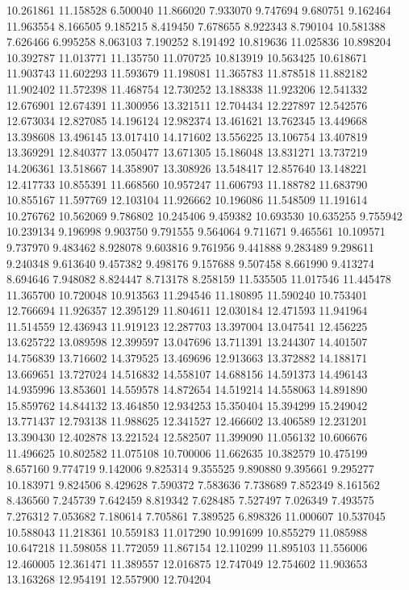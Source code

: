 10.261861
11.158528
6.500040
11.866020
7.933070
9.747694
9.680751
9.162464
11.963554
8.166505
9.185215
8.419450
7.678655
8.922343
8.790104
10.581388
7.626466
6.995258
8.063103
7.190252
8.191492
10.819636
11.025836
10.898204
10.392787
11.013771
11.135750
11.070725
10.813919
10.563425
10.618671
11.903743
11.602293
11.593679
11.198081
11.365783
11.878518
11.882182
11.902402
11.572398
11.468754
12.730252
13.188338
11.923206
12.541332
12.676901
12.674391
11.300956
13.321511
12.704434
12.227897
12.542576
12.673034
12.827085
14.196124
12.982374
13.461621
13.762345
13.449668
13.398608
13.496145
13.017410
14.171602
13.556225
13.106754
13.407819
13.369291
12.840377
13.050477
13.671305
15.186048
13.831271
13.737219
14.206361
13.518667
14.358907
13.308926
13.548417
12.857640
13.148221
12.417733
10.855391
11.668560
10.957247
11.606793
11.188782
11.683790
10.855167
11.597769
12.103104
11.926662
10.196086
11.548509
11.191614
10.276762
10.562069
9.786802
10.245406
9.459382
10.693530
10.635255
9.755942
10.239134
9.196998
9.903750
9.791555
9.564064
9.711671
9.465561
10.109571
9.737970
9.483462
8.928078
9.603816
9.761956
9.441888
9.283489
9.298611
9.240348
9.613640
9.457382
9.498176
9.157688
9.507458
8.661990
9.413274
8.694646
7.948082
8.824447
8.713178
8.258159
11.535505
11.017546
11.445478
11.365700
10.720048
10.913563
11.294546
11.180895
11.590240
10.753401
12.766694
11.926357
12.395129
11.804611
12.030184
12.471593
11.941964
11.514559
12.436943
11.919123
12.287703
13.397004
13.047541
12.456225
13.625722
13.089598
12.399597
13.047696
13.711391
13.244307
14.401507
14.756839
13.716602
14.379525
13.469696
12.913663
13.372882
14.188171
13.669651
13.727024
14.516832
14.558107
14.688156
14.591373
14.496143
14.935996
13.853601
14.559578
14.872654
14.519214
14.558063
14.891890
15.859762
14.844132
13.464850
12.934253
15.350404
15.394299
15.249042
13.771437
12.793138
11.988625
12.341527
12.466602
13.406589
12.231201
13.390430
12.402878
13.221524
12.582507
11.399090
11.056132
10.606676
11.496625
10.802582
11.075108
10.700006
11.662635
10.382579
10.475199
8.657160
9.774719
9.142006
9.825314
9.355525
9.890880
9.395661
9.295277
10.183971
9.824506
8.429628
7.590372
7.583636
7.738689
7.852349
8.161562
8.436560
7.245739
7.642459
8.819342
7.628485
7.527497
7.026349
7.493575
7.276312
7.053682
7.180614
7.705861
7.389525
6.898326
11.000607
10.537045
10.588043
11.218361
10.559183
11.017290
10.991699
10.855279
11.085988
10.647218
11.598058
11.772059
11.867154
12.110299
11.895103
11.556006
12.460005
12.361471
11.389557
12.016875
12.747049
12.754602
11.903653
13.163268
12.954191
12.557900
12.704204
